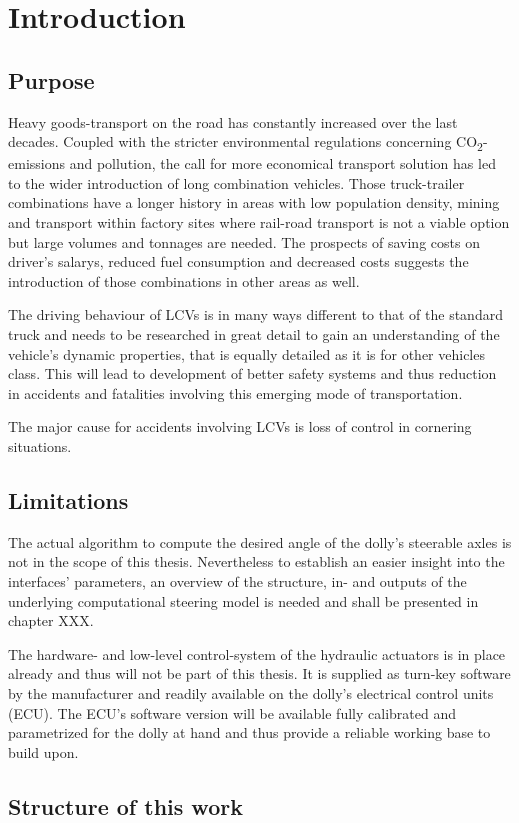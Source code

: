 \documentclass[ExampleMasters.tex]{subfiles}
\begin{document}
\clearpage	
\chapter{Introduction}
\label{chap:introduction}

\section{Purpose}
\label{sec:purpose}
Heavy goods-transport on the road has constantly increased over the last decades. Coupled with the stricter environmental regulations concerning CO\textsubscript{2}-emissions and pollution, the call for more economical transport solution has led to the wider introduction of long combination vehicles. Those truck-trailer combinations have a longer history in areas with low population density, mining and transport within factory sites where rail-road transport is not a viable option but large volumes and tonnages are needed. The prospects of saving costs on driver's salarys, reduced fuel consumption and decreased costs suggests the introduction of those combinations in other areas as well. 

The driving behaviour of LCVs is in many ways different to that of the standard truck and needs to be researched in great detail to gain an understanding of the vehicle's dynamic properties, that is equally detailed as it is for other vehicles class. This will lead to development of better safety systems and thus reduction in accidents and fatalities involving this emerging mode of transportation. 

The major cause for accidents involving LCVs is loss of control in cornering situations.

\section{Limitations}
\label{sec:limitations}
The actual algorithm to compute the desired angle of the dolly's steerable axles is not in the scope of this thesis. Nevertheless to establish an easier insight into the interfaces' parameters, an overview of the structure, in- and outputs of the underlying computational steering model is needed and shall be presented in chapter XXX. 

The hardware- and low-level control-system of the hydraulic actuators is in place already and thus will not be part of this thesis. It is supplied as turn-key software by the manufacturer and readily available on the dolly's electrical control units (ECU). The ECU's software version will be available fully calibrated and parametrized for the dolly at hand and thus provide a reliable working base to build upon. 


\section{Structure of this work}
\label{sec:structure}
\end{document}
